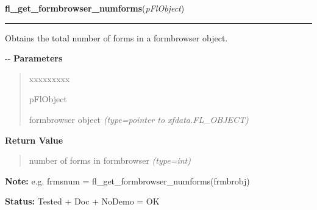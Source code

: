     \label{xformslib:flformbrowser:fl_get_formbrowser_numforms}

    \vspace{0.5ex}

\hspace{.8\funcindent}\begin{boxedminipage}{\funcwidth}

    \raggedright \textbf{fl\_get\_formbrowser\_numforms}(\textit{pFlObject})

    \vspace{-1.5ex}

    \rule{\textwidth}{0.5\fboxrule}
\setlength{\parskip}{2ex}

Obtains the total number of forms in a formbrowser object.

-{}-
\setlength{\parskip}{1ex}
      \textbf{Parameters}
      \vspace{-1ex}

      \begin{quote}
        \begin{Ventry}{xxxxxxxxx}

          \item[pFlObject]


formbrowser object
            {\it (type=pointer to xfdata.FL\_OBJECT)}

        \end{Ventry}

      \end{quote}

      \textbf{Return Value}
    \vspace{-1ex}

      \begin{quote}

number of forms in formbrowser
      {\it (type=int)}

      \end{quote}

\textbf{Note:} 
e.g. frmsnum = fl\_get\_formbrowser\_numforms(frmbrobj)


\textbf{Status:} 
Tested + Doc + NoDemo = OK


    \end{boxedminipage}

    \label{xformslib:flformbrowser:fl_get_formbrowser_form}

